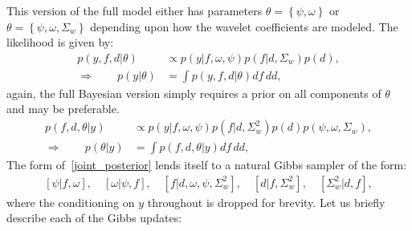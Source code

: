 \documentclass[a4paper,11pt]{article}
\begin{document}
This version of the full model either has parameters $\theta=\left\{\psi,\omega\right\}$ or $\theta=\left\{\psi,\omega,\Sigma_{w}\right\}$ depending upon how the wavelet coefficients are modeled. The likelihood is given by:
\begin{align}
 p(y,f,d|\theta) &\propto p(y|f,\omega,\psi)p(f|d,\Sigma_{w})p(d) , \\
 \Rightarrow{} \qquad p(y|\theta) &= \int{}p(y,f,d|\theta)df\,dd ,
\end{align}
again, the full Bayesian version simply requires a prior on all components of $\theta$ and may be preferable. 
\begin{align}
\label{joint_posterior} 
 p(f,d,\theta|y) &\propto p(y|f,\omega,\psi)p(f|d,\Sigma^{2}_{w})p(d)p(\psi,\omega,\Sigma_{w}) ,  \\
 \Rightarrow{} \qquad p(\theta|y) &= \int{}p(f,d,\theta|y)df\,dd ,
\end{align}
The form of~\eqref{joint_posterior} lends itself to a natural Gibbs sampler of the form:
\begin{align*}
 \left[\psi|f,\omega\right] , \quad
 \left[\omega|\psi,f\right] , \quad
 \left[f|d,\omega,\psi,\Sigma^{2}_{w}\right] , \quad
 \left[d|f,\Sigma^{2}_{w}\right] , \quad 
 \left[\Sigma^{2}_{w}|d,f\right] ,
\end{align*}
where the conditioning on $y$ throughout is dropped for brevity. Let us briefly describe each of the Gibbs updates:
\end{document}
